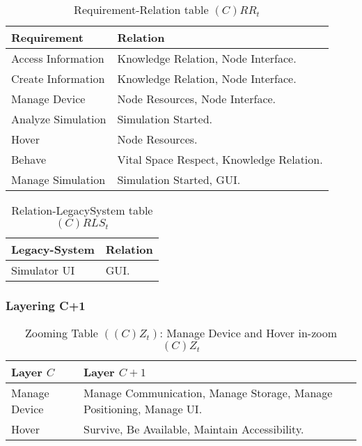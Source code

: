 \begin{table}[H]
	\centering
	\begin{tabular}{|p{4cm}|p{8cm}|}
			\hline
			\textbf{Requirement} & \textbf{Relation} \\
			\hline
			Access Information & Knowledge Relation, Node Interface.  \\
			\hline
			Create Information & Knowledge Relation, Node Interface.  \\
			\hline
			Manage Device & Node Resources, Node Interface.  \\
			\hline
			Analyze Simulation & Simulation Started. \\
			\hline
			Hover & Node Resources. \\
			\hline
			Behave & Vital Space Respect, Knowledge Relation. \\
			\hline
			Manage Simulation & Simulation Started, GUI. \\
			\hline
		\end{tabular}
	\caption{Requirement-Relation table $(C)RR_t$}
	\label{tab:crrt}
\end{table}

\begin{table}[H]
	\centering
	\begin{tabular}{|p{4cm}|p{8cm}|}
			\hline
			\textbf{Legacy-System} & \textbf{Relation} \\
			\hline
			Simulator UI & GUI. \\
			\hline
		\end{tabular}
	\caption{Relation-LegacySystem table $(C)RLS_t$}
	\label{tab:crlst}
\end{table}

\subsubsection{Layering C+1}

\begin{table}[H]
	\centering
	\begin{tabular}{|p{4cm}|p{8cm}|}
			\hline
			\textbf{Layer $C$} & \textbf{Layer $C+1$} \\
			\hline
			Manage Device & Manage Communication, Manage Storage, Manage Positioning,
			Manage UI. \\
			\hline
			Hover & Survive, Be Available, Maintain Accessibility. \\
			\hline
		\end{tabular}
	\caption{Zooming Table $\left( \left( C \right)Z_t \right)$: Manage
	Device and Hover in-zoom $(C)Z_t$}
	\label{tab:czt}
\end{table}

